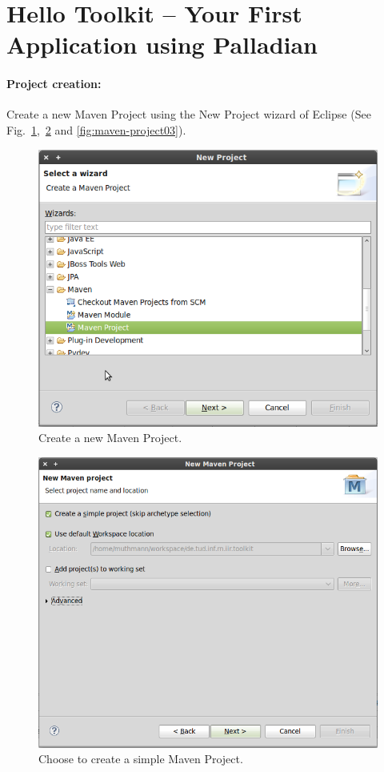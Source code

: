 \section{Hello Toolkit -- Your First Application using Palladian}
\paragraph{Project creation:} Create a new Maven Project using the New Project wizard of Eclipse (See Fig.~\ref{fig:maven-project01},~\ref{fig:maven-project02} and \ref{fig:maven-project03}).
\begin{figure}
\centering
\includegraphics[width=\textwidth]{img/ht01.png}
\caption{Create a new Maven Project.}
\label{fig:maven-project01}
\end{figure}
\begin{figure}
\centering
\includegraphics[width=\textwidth]{img/ht02.png}
\caption{Choose to create a simple Maven Project.}
\label{fig:maven-project02}
\end{figure}
